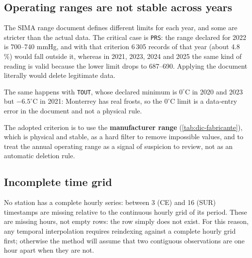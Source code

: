 \subsection{Operating ranges are not stable across years}\label{sec:dic:rangos}

The SIMA range document defines different limits for each year, and some are
stricter than the actual data. The critical case is \texttt{PRS}: the range
declared for 2022 is 700--740 mmHg, and with that criterion 6\,305 records of
that year (about 4.8\,\%) would fall outside it, whereas in 2021, 2023, 2024
and 2025 the same kind of reading is valid because the lower limit drops to
687--690. Applying the document literally would delete legitimate data.

The same happens with \texttt{TOUT}, whose declared minimum is $0^{\circ}$C
in 2020 and 2023 but $-6.5^{\circ}$C in 2021: Monterrey has real frosts, so
the $0^{\circ}$C limit is a data-entry error in the document and not a
physical rule.

The adopted criterion is to use the \textbf{manufacturer range}
(\cref{tab:dic-fabricante}), which is physical and stable, as a hard filter
to remove impossible values, and to treat the annual operating range as a
signal of suspicion to review, not as an automatic deletion rule.

\subsection{Incomplete time grid}\label{sec:dic:rejilla}

No station has a complete hourly series: between 3 (CE) and 16 (SUR)
timestamps are missing relative to the continuous hourly grid of its period.
These are missing hours, not empty rows: the row simply does not exist. For
this reason, any temporal interpolation requires reindexing against a
complete hourly grid first; otherwise the method will assume that two
contiguous observations are one hour apart when they are not.

